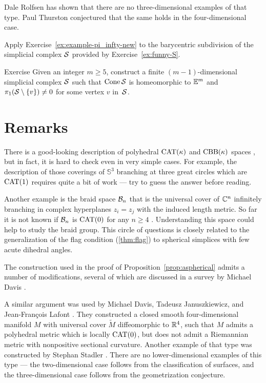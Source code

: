 Dale Rolfsen \cite{rolfsen} has shown that there are no three-dimensional examples of that type.
Paul Thurston \cite{thurston} conjectured that the same holds in the four-dimensional case.

Apply Exercise~\ref{ex:example-pi_infty-new} to the barycentric subdivision of the simplicial complex $\mathcal{S}$ provided by Exercise~\ref{ex:funny-S}.
\qeds

\begin{thm}{Exercise}\label{ex:funny-S}
Given an integer $m\ge 5$,
construct a finite $(m-1)$-dimensional simplicial complex $\mathcal{S}$ such that $\mathop{\rm Cone}\nolimits\mathcal{S}$ is homeomorphic to $\mathbb{E}^m$
and $\pi_1(\mathcal{S}\setminus\{v\})\ne0$ for some vertex $v$ in~$\mathcal{S}$.
\end{thm} 

\section{Remarks}

There is a good-looking description of polyhedral $\mathrm{CAT}(\kappa)$ and $\mathrm{CBB}(\kappa)$ spaces \cite[12.2 and 12.5]{alexander-kapovitch-petrunin-2025},
but in fact, it is hard to check even in very simple cases.
For example, the description of those coverings of $\mathbb{S}^3$ branching at three 
great circles which are $\mathrm{CAT}(1)$ requires quite a bit of work \cite{charney-davis-1993} --- try to guess the answer before reading.

Another example is the braid space $\mathcal{B}_n$ that  is the universal cover of $\mathbb{C}^n$ infinitely branching in complex hyperplanes $z_i=z_j$ with the induced length metric.
So far it is not known if $\mathcal{B}_n$ is $\mathrm{CAT}(0)$ for any $n\ge 4$ \cite{panov-petrunin-2016}.
Understanding this space could help to study the braid group.
This circle of questions is closely related to the generalization of the flag condition (\ref{thm:flag}) to  spherical simplices with few acute dihedral angles.


The construction used in the proof of  Proposition~\ref{prop:aspherical} admits a number of modifications,  
several of which are discussed in a survey by Michael Davis \cite{davis-2001}.

A similar argument was used by Michael Davis, 
Tadeusz Ja\-nu\-szkie\-wicz,
and  Jean-Fran\c{c}ois Lafont \cite{davis-januszkiewicz-lafont}.
They constructed a closed smooth four-dimensional manifold $M$ with  universal cover $\tilde M$ diffeomorphic to $\mathbb{R}^4$, such that $M$ admits a polyhedral metric which is locally $\mathrm{CAT}(0)$, but does not admit a Riemannian metric with nonpositive sectional curvature.
Another example of that type was constructed by Stephan Stadler \cite{stadler}.
There are no lower-dimensional examples of this type ---
the two-dimensional case follows from the  classification of surfaces,
and 
the three-dimensional case follows from the geometrization conjecture.

